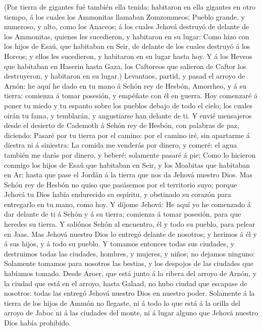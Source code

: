  (Por tierra de gigantes fué también ella tenida:
habitaron en ella gigantes en otro tiempo, á los cuales los Ammonitas
llamaban Zomzommeos;  Pueblo grande, y numeroso, y alto,
como los Anaceos; á los cuales Jehová destruyó de delante de los
Ammonitas, quienes les sucedieron, y habitaron en su lugar:
 Como hizo con los hijos de Esaú, que habitaban en Seir,
de delante de los cuales destruyó á los Horeos; y ellos les sucedieron,
y habitaron en su lugar hasta hoy.  Y á los Heveos que
habitaban en Haserin hasta Gaza, los Caftoreos que salieron de Caftor
los destruyeron, y habitaron en su lugar.)  Levantaos,
partid, y pasad el arroyo de Arnón: he aquí he dado en tu mano á Sehón
rey de Hesbón, Amorrheo, y á su tierra: comienza á tomar posesión, y
empéñate con él en guerra.  Hoy comenzaré á poner tu
miedo y tu espanto sobre los pueblos debajo de todo el cielo; los cuales
oirán tu fama, y temblarán, y angustiarse han delante de ti.
 Y envié mensajeros desde el desierto de Cademoth á Sehón
rey de Hesbón, con palabras de paz, diciendo:  Pasaré por
tu tierra por el camino: por el camino iré, sin apartarme á diestra ni á
siniestra:  La comida me venderás por dinero, y comeré:
el agua también me darás por dinero, y beberé: solamente pasaré á pie;
 Como lo hicieron conmigo los hijos de Esaú que habitaban
en Seir, y los Moabitas que habitaban en Ar; hasta que pase el Jordán á
la tierra que nos da Jehová nuestro Dios.  Mas Sehón rey
de Hesbón no quiso que pasásemos por el territorio suyo; porque Jehová
tu Dios había endurecido su espíritu, y obstinado su corazón para
entregarlo en tu mano, como hoy.  Y díjome Jehová: He
aquí yo he comenzado á dar delante de ti á Sehón y á su tierra; comienza
á tomar posesión, para que heredes su tierra.  Y saliónos
Sehón al encuentro, él y todo su pueblo, para pelear en Jaas.
 Mas Jehová nuestro Dios lo entregó delante de nosotros;
y herimos á él y á sus hijos, y á todo su pueblo.  Y
tomamos entonces todas sus ciudades, y destruimos todas las ciudades,
hombres, y mujeres, y niños; no dejamos ninguno: 
Solamente tomamos para nosotros las bestias, y los despojos de las
ciudades que habíamos tomado.  Desde Aroer, que está
junto á la ribera del arroyo de Arnón, y la ciudad que está en el
arroyo, hasta Galaad, no hubo ciudad que escapase de nosotros: todas las
entregó Jehová nuestro Dios en nuestro poder.  Solamente
á la tierra de los hijos de Ammón no llegaste, ni á todo lo que está á
la orilla del arroyo de Jaboc ni á las ciudades del monte, ni á lugar
alguno que Jehová nuestro Dios había prohibido.

